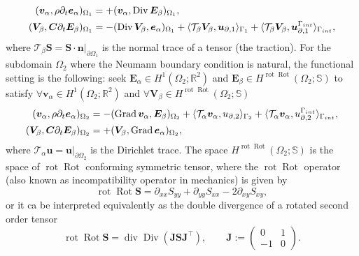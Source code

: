 \documentclass[11pt,a4paper]{article}
\newcommand{\bbR}{\mathbb{R}}
\DeclareMathOperator*{\Grad}{Grad}
\renewcommand{\div}{\operatorname{div}}
\DeclareMathOperator*{\Div}{Div}
\DeclareMathOperator*{\rot}{rot}
\DeclareMathOperator*{\Rot}{Rot}
\newcommand{\innerproduct}[3][\Omega]{(#2, #3)_{#1}}
\newcommand{\boundary}[3][\partial\Omega]{\langle #2, #3\rangle_{#1}}
\begin{document}
\begin{equation}
    \begin{split}
    \begin{alignedat}{2}
        \innerproduct[\Omega_1]{\bm{v}_\alpha}{\rho \partial_t\bm{e}_\alpha} &=  +\innerproduct[\Omega_1]{\bm{v}_\alpha}{\Div\bm{E}_\beta}, \\
        \innerproduct[\Omega_1]{\bm{V}_\beta}{\bm{C}\partial_t\bm{E}_\beta} &= -\innerproduct[\Omega_1]{\Div\bm{V}_\beta}{\bm{e}_\alpha} + \boundary[\Gamma_1]{\mathcal{T}_{\beta}\bm{V}_\beta}{\bm{u}_{\partial,1 }} + \boundary[\Gamma_{\rm int}]{\mathcal{T}_{\beta}\bm{V}_\beta}{\bm{u}_{\partial, 1}^{\Gamma_{\rm int}}},
    \end{alignedat}
    \end{split}
\label{eq:Elasticity-weak-D}
\end{equation}
where $\mathcal{T}_\beta \bm{S} = \bm{S} \cdot \bm{n}|_{\partial\Omega_1}$ is the normal trace of a tensor (the traction). For the subdomain $\Omega_2$ where the Neumann boundary condition is natural, the functional setting is the following: seek $\bm{E}_\alpha\in H^1(\Omega_2; \mathbb{R}^2)$ and $\bm{E}_\beta\in H^{\rot\Rot}(\Omega_2; \mathbb{S})$ to satisfy $\forall\bm{v}_\alpha\in H^1(\Omega_2; \bbR^2)$ and $\forall\bm{V}_\beta\in H^{\rot\Rot}(\Omega_2; \mathbb{S})$
\begin{equation}
    \begin{split}
    \begin{alignedat}{2}
        \innerproduct[\Omega_2]{\bm{v}_\alpha}{\rho \partial_t\bm{e}_\alpha} &= -\innerproduct[\Omega_2]{\Grad\bm{v}_\alpha}{\bm{E}_\beta} + \boundary[\Gamma_2]{\mathcal{T}_{\alpha}\bm{v}_\alpha}{{u}_{\partial,2}} + \boundary[\Gamma_{\rm int}]{\mathcal{T}_{\alpha}\bm{v}_\alpha}{{u}_{\partial,2}^{\Gamma_{\rm int}}}, \\
        \innerproduct[\Omega_2]{\bm{V}_\beta}{\bm{C}\partial_t\bm{E}_\beta} &= +\innerproduct[\Omega_2]{\bm{V}_\beta}{\Grad\bm{e}_\alpha},
    \end{alignedat}
    \end{split}
\label{eq:Elasticity-weak-N}
\end{equation}
where $\mathcal{T}_\alpha \bm{u} = \bm{u}|_{\partial\Omega_2}$ is the Dirichlet trace. The space $H^{\rot\Rot}(\Omega_2; \mathbb{S})$ is the space of $\rot\Rot$ conforming symmetric tensor, where the $\rot\Rot$ operator (also known as incompatibility operator in mechanics) is given by 
$$
\rot\Rot \bm{S} = \partial_{xx} S_{yy} + \partial_{yy} S_{xx} - 2 \partial_{xy}S_{xy},
$$
or it ca be interpreted equivalently as the double divergence of a rotated second order tensor
$$
\rot\Rot\bm{S} = \div\Div(\bm{JSJ}^\top), \qquad \bm{J}:=\begin{pmatrix}
    0 & 1 \\
    -1 & 0
\end{pmatrix}.
$$
  
\end{document}
